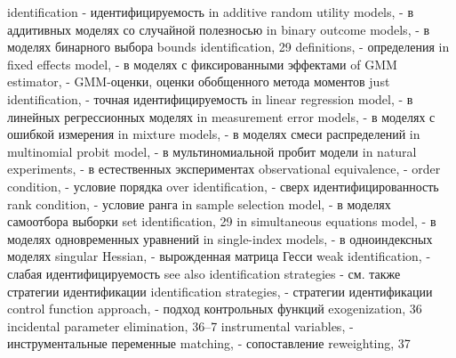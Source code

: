 identification - идентифицируемость
in additive random utility models, - в аддитивных моделях со случайной полезносью
in binary outcome models, - в моделях бинарного выбора
bounds identification, 29
definitions, - определения
in fixed effects model, - в моделях с фиксированными эффектами
of GMM estimator, - GMM-оценки, оценки обобщенного метода моментов
just identification, - точная идентифицируемость
in linear regression model, - в линейных регрессионных моделях
in measurement error models, - в моделях с ошибкой измерения
in mixture models, - в моделях смеси распределений
in multinomial probit model, - в мультиномиальной пробит модели
in natural experiments, - в естественных экспериментах
observational equivalence, - 
order condition, - условие порядка
over identification, - сверх идентифицированность
rank condition, - условие ранга
in sample selection model, - в моделях самоотбора выборки
set identification, 29
in simultaneous equations model, - в моделях одновременных уравнений 
in single-index models, - в одноиндексных моделях
singular Hessian, - вырожденная матрица Гесси
weak identification, - слабая идентифицируемость
see also identification strategies - см. также стратегии идентификации
identification strategies, - стратегии идентификации 
control function approach, - подход контрольных функций 
exogenization, 36
incidental parameter elimination, 36–7 
instrumental variables, - инструментальные переменные
matching, - сопоставление 
reweighting, 37


